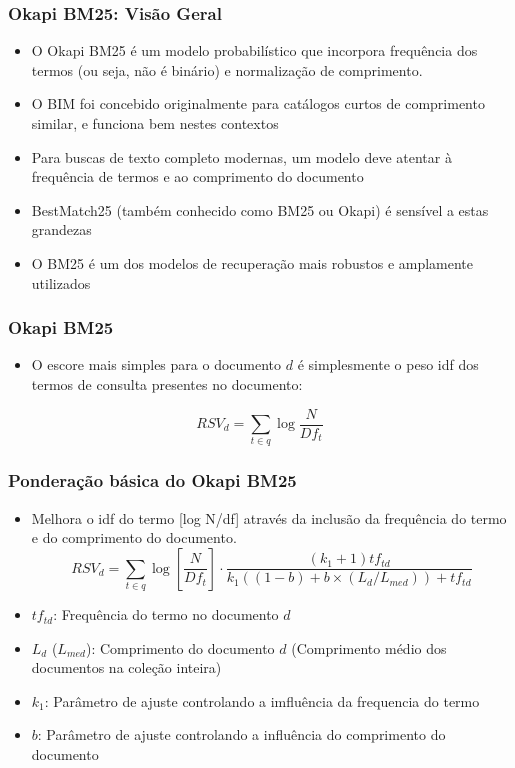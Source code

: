 \documentclass[compress]{beamer}
\def\myblue#1{\textcolor{texblue}{#1}}
\begin{document}
\begin{frame}[<+->]
\frametitle{Okapi BM25: Visão Geral}
\pause[2]

\begin{itemize} 
\item O Okapi BM25 é um modelo probabilístico que incorpora frequência dos termos (ou seja, não é binário) e normalização de comprimento.
\item O BIM foi concebido originalmente para catálogos curtos de comprimento similar, e funciona bem nestes contextos

\item Para buscas de texto completo modernas, um modelo deve atentar à frequência de termos e ao comprimento do documento

\item  BestMatch25 (também conhecido como \myblue{BM25} ou \myblue{Okapi}) é sensível a estas  grandezas

\item O BM25 é um dos modelos de recuperação mais robustos e amplamente utilizados 
\end{itemize}
\end{frame}

\begin{frame}[<+->]
\frametitle{Okapi BM25}
\pause

\begin{itemize}
\item O escore mais simples para o documento $d$ é simplesmente o peso idf dos termos de consulta presentes no documento:
\end{itemize}
\pause
\begin{equation}
\nonumber
RSV_d = \sum_{t \in q} \log\frac{N}{Df_t}
\end{equation}

\end{frame}

\begin{frame}[<+->]
\frametitle{Ponderação básica do Okapi BM25 }
\pause[2]

\begin{itemize}
\item Melhora o idf do termo [log N/df] através da inclusão da frequência do termo e do comprimento do documento.
\begin{equation}
\nonumber
RSV_d = \sum_{t \in q} \log\left[\frac{N}{Df_t}\right]\cdot
\frac{(k_1 + 1)tf_{td}}
{k_1 ((1-b) + b\times (L_d/L_{med})) + tf_{td}} 
\end{equation}
\item $tf_{td}$: Frequência do termo no documento $d$
\item $L_d$ ($L_{med}$): Comprimento do documento $d$ (Comprimento médio dos 
documentos na coleção inteira)
\item $k_1$: Parâmetro de ajuste controlando a imfluência da frequencia do termo
\item $b$: Parâmetro de ajuste controlando a influência do comprimento do documento 
\end{itemize}
\end{frame}
\end{document}
